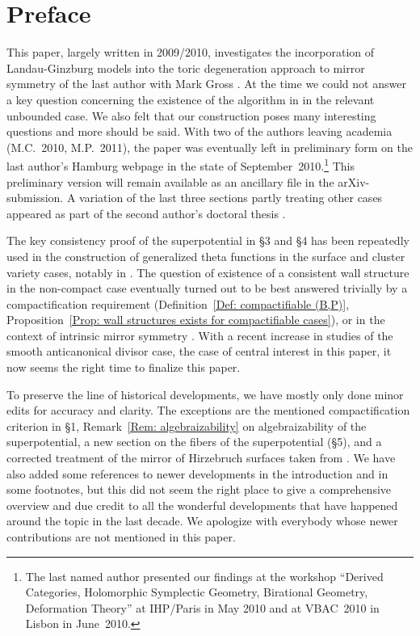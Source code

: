 \documentclass[11pt,letter]{amsart}
\theoremstyle{definition}
\theoremstyle{remark}
\numberwithin{equation}{section}
\numberwithin{figure}{section}
\begin{document}
\section*{Preface}
This paper, largely written in 2009/2010, investigates the incorporation of
Landau-Ginzburg models into the toric degeneration approach to mirror symmetry
of the last author with Mark Gross \cite{logmirror,affinecomplex}. At the time
we could not answer a key question concerning the existence of the algorithm in
\cite{affinecomplex} in the relevant unbounded case. We also felt that our
construction poses many interesting questions and more should be said. With two
of the authors leaving academia (M.C.~2010, M.P.~2011), the paper was eventually
left in preliminary form on the last author's Hamburg webpage in the state of
September~2010.\footnote{The last named author presented our findings at the
workshop ``Derived Categories, Holomorphic Symplectic Geometry, Birational
Geometry, Deformation Theory'' at IHP/Paris in May 2010 and at VBAC~2010 in
Lisbon in June~2010.} This preliminary version will remain available as an
ancillary file in the arXiv-submission. A variation of the last three sections
partly treating other cases appeared as part of the second author's
doctoral thesis \cite{MaxThesis}.

The key consistency proof of the superpotential in \S3 and \S4 has been
repeatedly used in the construction of generalized theta functions in the
surface and cluster variety cases, notably in \cite{GHK,GHKK}. The question of
existence of a consistent wall structure in the non-compact case eventually
turned out to be best answered trivially by a compactification requirement
(Definition~\ref{Def: compactifiable (B,P)}, Proposition~\ref{Prop: wall
structures exists for compactifiable cases}), or in the context of intrinsic
mirror symmetry \cite{Assoc, CanonicalWalls}. With a recent increase in studies
of the smooth anticanonical divisor case, the case of central interest in this
paper, it now seems the right time to finalize this paper.

To preserve the line of historical developments, we have mostly only done minor
edits for accuracy and clarity. The exceptions are the mentioned
compactification criterion in \S1, Remark~\ref{Rem: algebraizability} on
algebraizability of the superpotential, a new section on the fibers of the
superpotential (\S5), and a corrected treatment of the mirror of Hirzebruch
surfaces taken from \cite[\S5.3]{MaxThesis}. We have also added some references
to newer developments in the introduction and in some footnotes, but this did
not seem the right place to give a comprehensive overview and due credit to all
the wonderful developments that have happened around the topic in the last
decade. We apologize with everybody whose newer contributions are not mentioned
in this paper.
\end{document}
